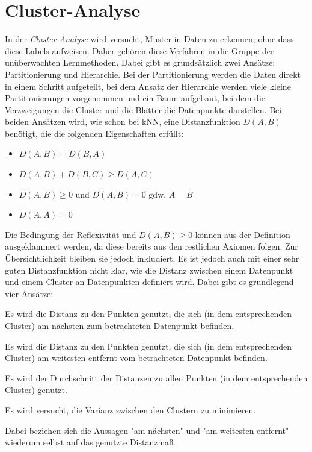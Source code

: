 \chapter{Cluster-Analyse}
	In der \emph{Cluster-Analyse} wird versucht, Muster in Daten zu erkennen, ohne dass diese Labels aufweisen. Daher gehören diese Verfahren in die Gruppe der unüberwachten Lernmethoden. Dabei gibt es grundsätzlich zwei Ansätze: Partitionierung und Hierarchie. Bei der Partitionierung werden die Daten direkt in einem Schritt aufgeteilt, bei dem Ansatz der Hierarchie werden viele kleine Partitionierungen vorgenommen und ein Baum aufgebaut, bei dem die Verzweigungen die Cluster und die Blätter die Datenpunkte darstellen. Bei beiden Ansätzen wird, wie schon bei kNN, eine Distanzfunktion \( D(A, B) \) benötigt, die die folgenden Eigenschaften erfüllt:
	\begin{itemize}
		\item {}            \( D(A, B) = D(B, A) \)
		\item {}  \( D(A, B) + D(B, C) \geq D(A, C) \)
		\item {} \( D(A, B) \geq 0 \) und \( D(A, B) = 0 \text{ gdw. } A = B \)
		\item {}         \( D(A, A) = 0 \)
	\end{itemize}
	Die Bedingung der Reflexivität und \( D(A, B) \geq 0 \) können aus der Definition ausgeklammert werden, da diese bereits aus den restlichen Axiomen folgen. Zur Übersichtlichkeit bleiben sie jedoch inkludiert. Es ist jedoch auch mit einer sehr guten Distanzfunktion nicht klar, wie die Distanz zwischen einem Datenpunkt und einem Cluster an Datenpunkten definiert wird. Dabei gibt es grundlegend vier Ansätze:
	\begin{description}[leftmargin = 5cm]
		\item[Single Linkage] Es wird die Distanz zu den Punkten genutzt, die sich (in dem entsprechenden Cluster) am nächsten zum betrachteten Datenpunkt befinden.
		\item[Complete Linkage] Es wird die Distanz zu den Punkten genutzt, die sich (in dem entsprechenden Cluster) am weitesten entfernt vom betrachteten Datenpunkt befinden.
		\item[Group Average Linkage] Es wird der Durchschnitt der Distanzen zu allen Punkten (in dem entsprechenden Cluster) genutzt.
		\item[Wards Linkage] Es wird versucht, die Varianz zwischen den Clustern zu minimieren.
	\end{description}
	Dabei beziehen sich die Aussagen "am nächsten" und "am weitesten entfernt" wiederum selbst auf das genutzte Distanzmaß.

